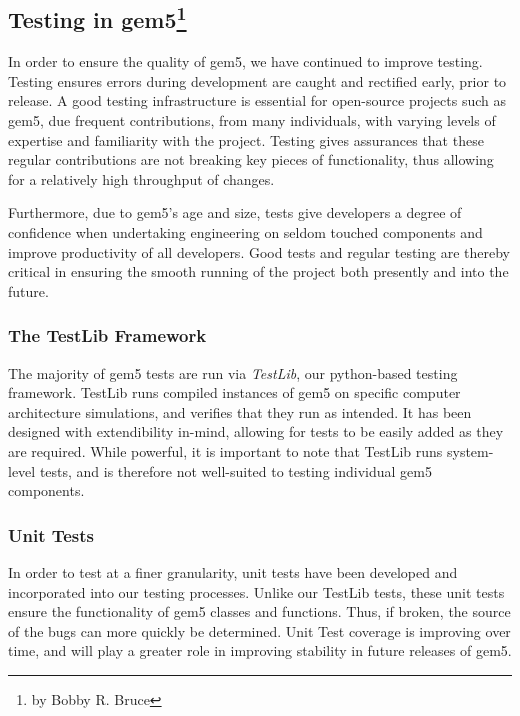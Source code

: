 \subsection[Testing in gem5]{Testing in gem5\footnote{by Bobby R. Bruce}}
\label{sec:testing}

In order to ensure the quality of gem5, we have continued to improve testing.
Testing ensures errors during development are caught and rectified early, prior
to release. A good testing infrastructure is essential for open-source projects
such as gem5, due frequent contributions, from many individuals, with varying
levels of expertise and familiarity with the project. Testing gives assurances
that these regular contributions are not breaking key pieces of functionality,
thus allowing for a relatively high throughput of changes.

Furthermore, due to gem5's age and size, tests give developers a degree of confidence when undertaking engineering on seldom touched components and improve productivity of all developers.
Good tests and regular testing are thereby critical in ensuring the smooth running of the project both presently and into the future.

\subsubsection{The TestLib Framework}

The majority of gem5 tests are run via \emph{TestLib}, our python-based
testing framework. TestLib runs compiled instances of gem5 on specific
computer architecture simulations, and verifies that they run as intended. It
has been designed with extendibility in-mind, allowing for tests to be easily
added as they are required. While powerful, it is important to note that
TestLib runs system-level tests, and is therefore not well-suited to testing
individual gem5 components.

\subsubsection{Unit Tests}

In order to test at a finer granularity, unit tests have been developed and
incorporated into our testing processes. Unlike our TestLib tests, these unit
tests ensure the functionality of gem5 classes and functions. Thus, if broken,
the source of the bugs can more quickly be determined. Unit Test coverage is
improving over time, and will play a greater role in improving stability in
future releases of gem5.


